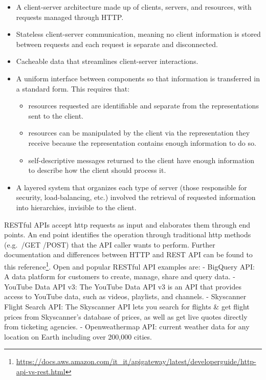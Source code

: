 \documentclass[
  12pt,
  a4paper,
  oneside]{book}
\DeclareRobustCommand{\href}[2]{#2\footnote{\url{#1}}}
\providecommand{\tightlist}{%
  \setlength{\itemsep}{0pt}\setlength{\parskip}{0pt}}
\theoremstyle{definition}
\theoremstyle{definition}
\theoremstyle{definition}
\theoremstyle{remark}
\begin{document}
\begin{itemize}
\tightlist
\item
  A client-server architecture made up of clients, servers, and resources, with requests managed through HTTP.
\item
  Stateless client-server communication, meaning no client information is stored between requests and each request is separate and disconnected.
\item
  Cacheable data that streamlines client-server interactions.
\item
  A uniform interface between components so that information is transferred in a standard form. This requires that:

  \begin{itemize}
  \tightlist
  \item
    resources requested are identifiable and separate from the representations sent to the client.
  \item
    resources can be manipulated by the client via the representation they receive because the representation contains enough information to do so.
  \item
    self-descriptive messages returned to the client have enough information to describe how the client should process it.
  \end{itemize}
\item
  A layered system that organizes each type of server (those responsible for security, load-balancing, etc.) involved the retrieval of requested information into hierarchies, invisible to the client.
\end{itemize}

RESTful APIs accept http requests as input and elaborates them through end points. An end point identifies the operation through traditional http methods (e.g.~/GET /POST) that the API caller wants to perform. Further documentation and differences between HTTP and REST API can be found to this \href{https://docs.aws.amazon.com/it_it/apigateway/latest/developerguide/http-api-vs-rest.html}{reference}.
Open and popular RESTful API examples are:
- BigQuery API: A data platform for customers to create, manage, share and query data.
- YouTube Data API v3: The YouTube Data API v3 is an API that provides access to YouTube data, such as videos, playlists, and channels.
- Skyscanner Flight Search API: The Skyscanner API lets you search for flights \& get flight prices from Skyscanner's database of prices, as well as get live quotes directly from ticketing agencies.
- Openweathermap API: current weather data for any location on Earth including over 200,000 cities.
\end{document}
